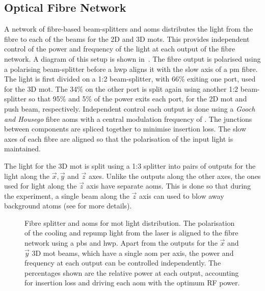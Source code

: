 \subsection{Optical Fibre
Network}\label{subsec:optical_fibre} A network of fibre-based
beam-splitters and \acp{aom} distributes the light from the \Muquans
fibre to each of the beams for the 2D and 3D \acp{mot}. This provides
independent control of the power and frequency of the light at each
output of the fibre network. A diagram of this setup is shown
in~. The \Muquans fibre output is
polarised using a polarising beam-splitter before a \ac{hwp} aligns it
with the slow axis of a \ac{pm} fibre. The light is first divided on a
1:2 beam-splitter, with 66\% exiting one port, used for the 3D
\ac{mot}. The 34\% on the other port is split again using another 1:2
beam-splitter so that 95\% and 5\% of the power exits each port, for
the 2D \ac{mot} and push beam, respectively. Independent control each
output is done using a \textit{Gooch and Housego} fibre \acp{aom} with
a central modulation frequency of . The
junctions between components are spliced together to minimise
insertion loss. The slow axes of each fibre are aligned so that the
polarisation of the input light is maintained. \par\noindent The light
for the 3D \ac{mot} is split using a 1:3 splitter into pairs of
outputs for the light along the \(\vec{x},\vec{y}\) and \(\vec{z}\)
axes. Unlike the outputs along the other axes, the ones used for light
along the \(\vec{z}\) axis have separate \acp{aom}. This is done so
that during the experiment, a single beam along the \(\vec{z}\) axis
can used to blow away background atoms (see
 for more details).

\begin{figure}[!htbp] 
  \centering 
  \fontsize{18pt}{18pt}
  \resizebox{0.5\textwidth}{!}{}
  \caption[Network of optical fibre splitters and \acp{aom} for
  \ac{mot}light distribution]{Fibre splitter and \acp{aom} for
  \ac{mot} light distribution. The polarisation of the cooling and
repump light from the \Muquans laser is aligned to the fibre network
using a \ac{pbs} and \ac{hwp}. Apart from the outputs for the
\(\vec{x}\) and \(\vec{y}\) 3D \ac{mot} beams, which have a single
\ac{aom} per axis, the power and frequency at each output can be
controlled independently. The percentages shown are the relative power
at each output, accounting for insertion loss and driving each
\ac{aom} with the optimum RF power.} 
\label{fig:fibre_network}
\end{figure} 
